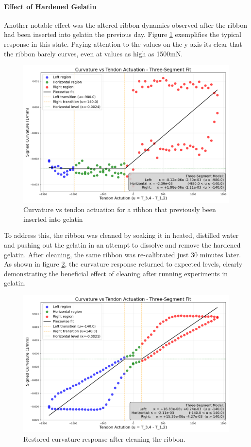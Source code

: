 \paragraph*{Effect of Hardened Gelatin}
Another notable effect was the altered ribbon dynamics observed after the ribbon had been inserted into gelatin the previous day. Figure \ref{fig:gelatin} exemplifies the typical response in this state. Paying attention to the values on the y-axis its clear that the ribbon barely curves, even at values as high as 1500mN.
\begin{figure} [H]
    \centering
    \includegraphics[width=0.9\linewidth]{images/ribbonadapter/ribbonfit_2025-06-27_17-45-46.png}
    \caption{Curvature vs tendon actuation for a ribbon that previously been inserted into gelatin}
    \label{fig:gelatin}
\end{figure}
To address this, the ribbon was cleaned by soaking it in heated, distilled water and pushing out the gelatin in an attempt to dissolve and remove the hardened gelatin. After cleaning, the same ribbon was re-calibrated just 30 minutes later. As shown in figure \ref{fig:curvaturevstension2}, the curvature response returned to expected levels, clearly demonstrating the beneficial effect of cleaning after running experiments in gelatin. 

\begin{figure} [H]
    \centering
    \includegraphics[width=0.9\linewidth]{images/ribbonadapter/ribbonfit_2025-06-30_15-59-06.png}
    \caption{Restored curvature response after cleaning the ribbon.}
    \label{fig:curvaturevstension2}
\end{figure}

